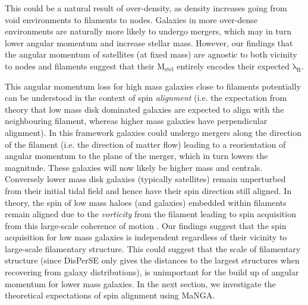 This could be a natural result of over-density, as density increases going from void environments to filaments to nodes. Galaxies in more over-dense environments are naturally more likely to undergo mergers, which may in turn lower angular momentum and increase stellar mass. However, our findings that the angular momentum of satellites (at fixed mass) are agnostic to both vicinity to nodes and filaments suggest that their $\mathrm{M_{stel}}$ entirely encodes their expected $\mathrm{\lambda_R}$. 

This angular momentum loss for high mass galaxies close to filaments potentially can be understood in the context of spin \textit{alignment} (i.e. the expectation from theory that low mass disk dominated galaxies are expected to align with the neighbouring filament, whereas higher mass galaxies have perpendicular alignment). In this framework galaxies could undergo mergers along the direction of the filament (i.e. the direction of matter flow) leading to a reorientation of angular momentum to the plane of the merger, which in turn lowers the magnitude. These galaxies will now likely be higher mass and centrals. Conversely lower mass disk galaxies (typically satellites) remain unperturbed from their initial tidal field and hence have their spin direction still aligned. In theory, the spin of low mass haloes (and galaxies) embedded within filaments remain aligned due to the \textit{vorticity} from the filament leading to spin acquisition from this large-scale coherence of motion \citep[e.g.][]{pichon2011,laigle2015, codis2015}. Our findings suggest that the spin acquisition for low mass galaxies is independent regardless of their vicinity to large-scale filamentary structure. This could suggest that the scale of filamentary structure (since DisPerSE only gives the distances to the largest structures when recovering from galaxy distributions), is unimportant for the build up of angular momentum for lower mass galaxies.  In the next section, we investigate the theoretical expectations of spin alignment using MaNGA.

